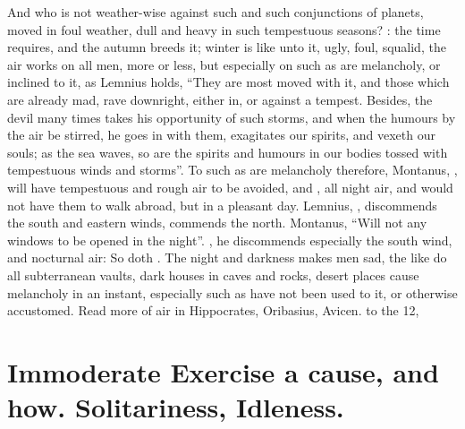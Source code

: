 And who is not weather-wise against such and such conjunctions of planets,
moved in foul weather, dull and heavy in such tempestuous seasons?
: the time requires,
and the autumn breeds it; winter is like unto it, ugly, foul, squalid, the air
works on all men, more or less, but especially on such as are melancholy, or
inclined to it, as Lemnius holds, \enquote{They are most moved
with it, and those which are already mad, rave downright, either in, or against
a tempest. Besides, the devil many times takes his opportunity of such storms,
and when the humours by the air be stirred, he goes in with them, exagitates
our spirits, and vexeth our souls; as the sea waves, so are the spirits and
humours in our bodies tossed with tempestuous winds and storms}. To such as are
melancholy therefore, Montanus, , will have
tempestuous and rough air to be avoided, and ,
all night air, and would not have them to walk abroad, but in a pleasant day.
Lemnius, , discommends the south and eastern
winds, commends the north. Montanus, 
\enquote{Will not any windows to be opened in the night}.
, he discommends especially
the south wind, and nocturnal air: So doth \Plutarch{}. The
night and darkness makes men sad, the like do all subterranean vaults, dark
houses in caves and rocks, desert places cause melancholy in an instant,
especially such as have not been used to it, or otherwise accustomed. Read more
of air in Hippocrates, 
Oribasius,  Avicen.
 to the 12,
\etc{}

\section[Immoderate Exercise, Idleness]{Immoderate Exercise a cause, and how.
Solitariness, Idleness.}

